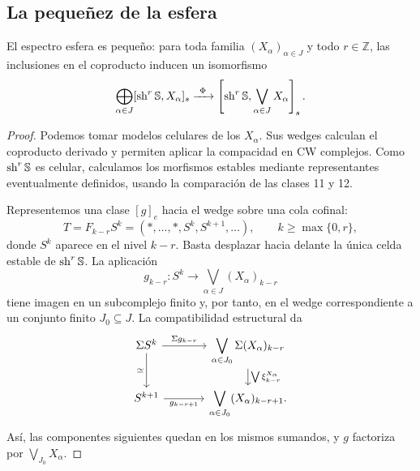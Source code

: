 \subsection{La pequeñez de la esfera}
\begin{prop}\label{prop:c19-esfera-pequena}
El espectro esfera es pequeño: para toda familia $(X_\alpha)_{\alpha\in J}$ y todo $r\in\mathbb Z$, las inclusiones en el coproducto inducen un isomorfismo
\[
\bigoplus_{\alpha\in J}[\operatorname{sh}^r\mathbb S,X_\alpha]_s
\xrightarrow{\ \Phi\ }
\left[\operatorname{sh}^r\mathbb S,\bigvee_{\alpha\in J}X_\alpha\right]_s.
\]
\end{prop}
\begin{proof}
Podemos tomar modelos celulares de los $X_\alpha$. Sus wedges calculan el coproducto derivado y permiten aplicar la compacidad en CW complejos. Como $\operatorname{sh}^r\mathbb S$ es celular, calculamos los morfismos estables mediante representantes eventualmente definidos, usando la comparación de las clases 11 y 12.

Representemos una clase $[g]_e$ hacia el wedge sobre una cola cofinal:
\[
T=F_{k-r}S^k=(*,\ldots,*,S^k,S^{k+1},\ldots),
\qquad k\ge\max\{0,r\},
\]
donde $S^k$ aparece en el nivel $k-r$. Basta desplazar hacia delante la única celda estable de $\operatorname{sh}^r\mathbb S$. La aplicación
\[
g_{k-r}\colon S^k\longrightarrow
\bigvee_{\alpha\in J}(X_\alpha)_{k-r}
\]
tiene imagen en un subcomplejo finito y, por tanto, en el wedge correspondiente a un conjunto finito $J_0\subseteq J$. La compatibilidad estructural da
\[
\begin{tikzcd}[column sep=large,row sep=1.5em]
\Sigma S^k\arrow[r,"\Sigma g_{k-r}"]\arrow[d,"\simeq"']
&\displaystyle\bigvee_{\alpha\in J_0}\Sigma(X_\alpha)_{k-r}\arrow[d,"\bigvee\xi^{X_\alpha}_{k-r}"]\\
S^{k+1}\arrow[r,"g_{k-r+1}"']
&\displaystyle\bigvee_{\alpha\in J_0}(X_\alpha)_{k-r+1}.
\end{tikzcd}
\]
Así, las componentes siguientes quedan en los mismos sumandos, y $g$ factoriza por $\bigvee_{J_0}X_\alpha$.


\end{proof}
